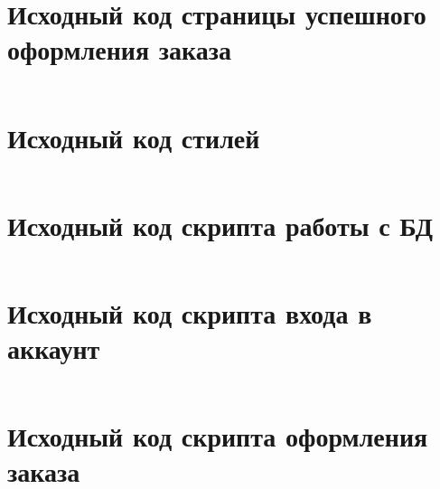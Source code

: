 \documentclass[a4paper, 14pt]{extarticle}
\newenvironment{code}{\captionsetup{type=listing}}{}
\begin{document}
\begin{code}
  \inputminted{html}{../task-1/order.html}
\end{code}

\newpage

\section{Исходный код страницы успешного оформления заказа}
\label{app:order-success.html}

\begin{code}
  \inputminted{html}{../task-1/order-success.html}
\end{code}

\newpage

\section{Исходный код стилей}
\label{app:style.css}

\begin{code}
  \inputminted{css}{../task-1/css/style.css}
\end{code}

\newpage

\section{Исходный код скрипта работы с БД}
\label{app:database.php}

\begin{code}
  \inputminted{php}{../task-1/database.php}
\end{code}

\newpage

\section{Исходный код скрипта входа в аккаунт}
\label{app:login.php}

\begin{code}
  \inputminted{php}{../task-1/login.php}
\end{code}

\newpage

\section{Исходный код скрипта оформления заказа}
\label{app:order.php}

\begin{code}
  \inputminted{php}{../task-1/order.php}
\end{code}
\end{document}
